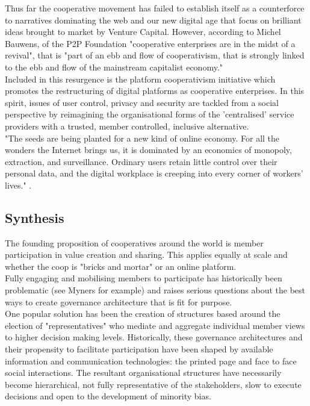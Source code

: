 Thus far the cooperative movement has failed to establish itself as a counterforce to narratives dominating the web and our new digital age that focus on brilliant ideas brought to market by Venture Capital. However, according to Michel Bauwens, of the P2P Foundation "cooperative enterprises are in the midst of a revival", that is "part of an ebb and flow of cooperativism, that is strongly linked to the ebb and flow of the mainstream capitalist economy."\cite{Open_cooperativism} \\

Included in this resurgence is the platform cooperativism initiative which promotes the restructuring of digital platforms as cooperative enterprises. In this spirit, issues of user control, privacy and security are tackled from a social perspective by reimagining the organisational forms of the 'centralised' service providers with a trusted, member controlled, inclusive alternative. \\

"The seeds are being planted for a new kind of online economy. For all the wonders the Internet brings us, it is dominated by an economics of monopoly, extraction, and surveillance. Ordinary users retain little control over their personal data, and the digital workplace is creeping into every corner of workers' lives." \cite{Platform_cooperativism}.\\


\subsection{Synthesis}
The founding proposition of cooperatives around the world is member participation in value creation and sharing. This applies equally at scale and whether the coop is "bricks and mortar" or an online platform.\\  

Fully engaging and mobilising members to participate has historically been problematic (see Myners\cite{Myners} for example) and raises serious questions about the best ways to create governance architecture that is fit for purpose. \\

One popular solution has been the creation of structures based around the election of "representatives" who mediate and aggregate individual member views to higher decision making levels. Historically, these governance architectures and their propensity to facilitate participation have been shaped by available information and communication technologies: the printed page and face to face social interactions. The resultant organisational structures have necessarily become hierarchical, not fully representative of the stakeholders, slow to execute decisions and open to the development of minority bias.\\

